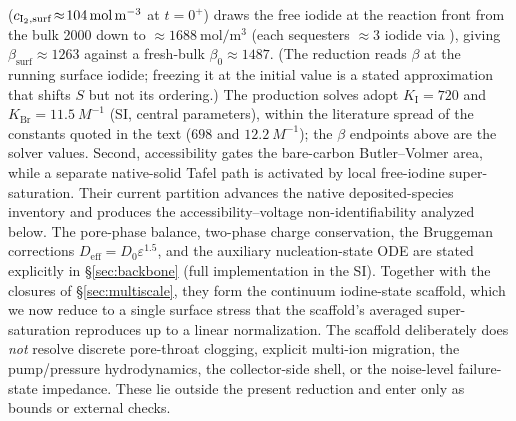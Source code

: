 \documentclass[11pt]{article}
\newcommand{\epsl}{\varepsilon}
\newcommand{\Deff}{D_{\mathrm{eff}}}
\begin{document}
($c_{\ce{I2},\mathrm{surf}}\!\approx\!\SI{104}{\mol\per\meter\cubed}$ at $t\!=\!0^{+}$) draws the free iodide at
the reaction front from the bulk \SI{2000}{} down to $\approx\SI{1688}{\mol\per\meter\cubed}$ (each 
sequesters $\approx3$ iodide via ), giving $\beta_{\mathrm{surf}}\!\approx\!1263$ against a fresh-bulk
$\beta_0\!\approx\!1487$. (The reduction reads $\beta$ at the running surface iodide; freezing it at the initial
value is a stated approximation that shifts $S$ but not its ordering.) The production solves adopt
$K_{\mathrm I}=720$ and $K_{\mathrm{Br}}=11.5~\si{M^{-1}}$ (SI, central parameters), within the literature
spread of the constants quoted in the text ($698$ and $12.2~\si{M^{-1}}$); the $\beta$ endpoints above are the
solver values. Second, accessibility gates the bare-carbon Butler--Volmer area, while a separate native-solid
Tafel path is activated by local free-iodine super-saturation. Their current partition advances the native
deposited-species inventory and produces the accessibility--voltage non-identifiability analyzed below. The
pore-phase balance, two-phase charge conservation, the Bruggeman corrections
$\Deff=D_0\epsl^{1.5}$, and the auxiliary nucleation-state ODE are stated explicitly in
\S\ref{sec:backbone}
(full implementation in the SI). Together with the closures of
\S\ref{sec:multiscale}, they form the continuum iodine-state scaffold, which we now reduce to a single
surface stress that the scaffold's averaged super-saturation reproduces up to a linear normalization. The
scaffold deliberately does \emph{not} resolve discrete pore-throat clogging, explicit multi-ion migration,
the
pump/pressure hydrodynamics, the collector-side shell, or the noise-level failure-state impedance. These
lie outside the present reduction and enter only as bounds or external checks.
\end{document}
